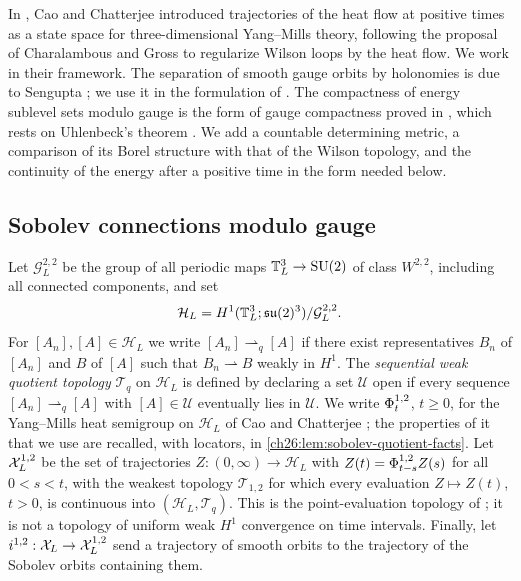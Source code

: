 In \cite{CCState2023v4}, Cao and Chatterjee introduced trajectories of the heat flow at positive times as a state space for three-dimensional Yang--Mills theory, following the proposal of Charalambous and Gross \cite{CharalambousGross2013} to regularize Wilson loops by the heat flow. We work in their framework. The separation of smooth gauge orbits by holonomies is due to Sengupta \cite{Sengupta1994}; we use it in the formulation of \cite[Lemma 1.2, p.~4]{CCState2023v4}. The compactness of energy sublevel sets modulo gauge is the form of gauge compactness proved in \cite[Theorem 3.8 and Theorem 3.51]{CCState2023v4}, which rests on Uhlenbeck's theorem \cite{Uhlenbeck1982Connections}. We add a countable determining metric, a comparison of its Borel structure with that of the Wilson topology, and the continuity of the energy after a positive time in the form needed below.

\subsection{Sobolev connections modulo gauge}

\begin{definition}\label{ch26:def:sobolev-trajectory-space}
Let $\mathcal G_L^{2,2}$ be the group of all periodic maps $\mathbb T_L^3\to\mathrm{SU}(2)$ of class $W^{2,2}$, including all connected components, and set
\[
 \mathcal H_L=H^1(\mathbb T_L^3;\mathfrak{su}(2)^3)/\mathcal G_L^{2,2}.
\]
For $[A_n],[A]\in\mathcal H_L$ we write $[A_n]\rightharpoonup_q[A]$ if there exist representatives $B_n$ of $[A_n]$ and $B$ of $[A]$ such that $B_n\rightharpoonup B$ weakly in $H^1$. The \emph{sequential weak quotient topology} $\mathcal T_q$ on $\mathcal H_L$ is defined by declaring a set $\mathcal U$ open if every sequence $[A_n]\rightharpoonup_q[A]$ with $[A]\in\mathcal U$ eventually lies in $\mathcal U$. We write $\Phi^{1,2}_t$, $t\ge0$, for the Yang--Mills heat semigroup on $\mathcal H_L$ of Cao and Chatterjee \cite{CCState2023v4}; the properties of it that we use are recalled, with locators, in \cref{ch26:lem:sobolev-quotient-facts}. Let $\mathcal X_L^{1,2}$ be the set of trajectories $Z:(0,\infty)\to\mathcal H_L$ with $Z(t)=\Phi^{1,2}_{t-s}Z(s)$ for all $0<s<t$, with the weakest topology $\mathcal T_{1,2}$ for which every evaluation $Z\mapsto Z(t)$, $t>0$, is continuous into $(\mathcal H_L,\mathcal T_q)$. This is the point-evaluation topology of \cite[Definition 3.70, p.~41]{CCState2023v4}; it is not a topology of uniform weak $H^1$ convergence on time intervals. Finally, let $i^{1,2}:\mathcal X_L\to\mathcal X_L^{1,2}$ send a trajectory of smooth orbits to the trajectory of the Sobolev orbits containing them.
\end{definition}

